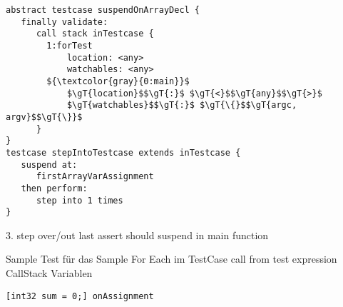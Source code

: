 \begin{lstlisting}[language=testingDSL]
abstract testcase suspendOnArrayDecl {            
   finally validate:                     
      call stack inTestcase {
      	1:forTest
      		location: <any>
      		watchables: <any>
      	${\textcolor{gray}{0:main}}$
      		$\gT{location}$$\gT{:}$ $\gT{<}$$\gT{any}$$\gT{>}$
      		$\gT{watchables}$$\gT{:}$ $\gT{\{}$$\gT{argc, argv}$$\gT{\}}$
      }
}
testcase stepIntoTestcase extends inTestcase {            
   suspend at: 
      firstArrayVarAssignment
   then perform:                         
      step into 1 times                            
}
\end{lstlisting}





3. step over/out last assert should suspend in main function  

Sample
	Test für das Sample
		For Each im TestCase call from test expression
			CallStack
			Variablen
			
\begin{lstlisting}[language=reducedMbeddr]
	[int32 sum = 0;] onAssignment
\end{lstlisting}			